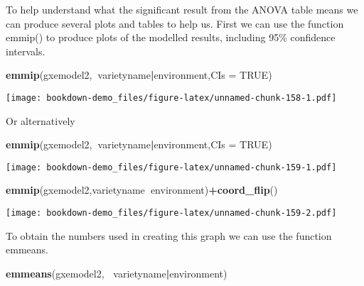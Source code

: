 \documentclass[]{book}
\newenvironment{Shaded}{\begin{snugshade}}{\end{snugshade}}
\newcommand{\KeywordTok}[1]{\textcolor[rgb]{0.13,0.29,0.53}{\textbf{#1}}}
\newcommand{\DataTypeTok}[1]{\textcolor[rgb]{0.13,0.29,0.53}{#1}}
\newcommand{\OtherTok}[1]{\textcolor[rgb]{0.56,0.35,0.01}{#1}}
\newcommand{\OperatorTok}[1]{\textcolor[rgb]{0.81,0.36,0.00}{\textbf{#1}}}
\newcommand{\NormalTok}[1]{#1}
\theoremstyle{definition}
\theoremstyle{definition}
\theoremstyle{definition}
\theoremstyle{remark}
\begin{document}
To help understand what the significant result from the ANOVA table
means we can produce several plots and tables to help us. First we can
use the function emmip() to produce plots of the modelled results,
including 95\% confidence intervals.

\begin{Shaded}
\begin{Highlighting}[]
\KeywordTok{emmip}\NormalTok{(gxemodel2,}\OperatorTok{~}\NormalTok{varietyname}\OperatorTok{|}\NormalTok{environment,}\DataTypeTok{CIs =} \OtherTok{TRUE}\NormalTok{)}
\end{Highlighting}
\end{Shaded}

\texttt{[image: bookdown-demo\_files/figure-latex/unnamed-chunk-158-1.pdf]}

Or alternatively

\begin{Shaded}
\begin{Highlighting}[]
\KeywordTok{emmip}\NormalTok{(gxemodel2,}\OperatorTok{~}\NormalTok{varietyname}\OperatorTok{|}\NormalTok{environment,}\DataTypeTok{CIs =} \OtherTok{TRUE}\NormalTok{)}
\end{Highlighting}
\end{Shaded}

\texttt{[image: bookdown-demo\_files/figure-latex/unnamed-chunk-159-1.pdf]}

\begin{Shaded}
\begin{Highlighting}[]
\KeywordTok{emmip}\NormalTok{(gxemodel2,varietyname}\OperatorTok{~}\NormalTok{environment)}\OperatorTok{+}\KeywordTok{coord_flip}\NormalTok{()}
\end{Highlighting}
\end{Shaded}

\texttt{[image: bookdown-demo\_files/figure-latex/unnamed-chunk-159-2.pdf]}

To obtain the numbers used in creating this graph we can use the
function emmeans.

\begin{Shaded}
\begin{Highlighting}[]
\KeywordTok{emmeans}\NormalTok{(gxemodel2, }\OperatorTok{~}\NormalTok{varietyname}\OperatorTok{|}\NormalTok{environment)}
\end{Highlighting}
\end{Shaded}
\end{document}
